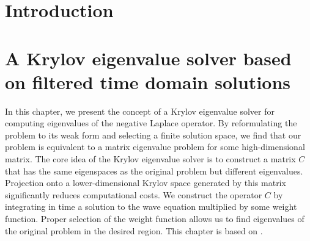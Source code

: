\documentclass[a4paper,11pt,bibliography=totoc,listof=totoc,headinclude=true,cleardoublepage=empty,oneside]{scrbook}
\begin{document}
\cleardoublepage



\tableofcontents

\cleardoublepage
{} 


\chapter{Introduction}
\label{chapter:introduction}


\chapter{A Krylov eigenvalue solver based on filtered time domain solutions}
\label{chapter:ftd}
In this chapter, we present the concept of a Krylov eigenvalue solver for computing eigenvalues of the negative Laplace operator. By reformulating the problem to its weak form and selecting a finite solution space, we find that our problem is equivalent to a matrix eigenvalue problem for some high-dimensional matrix. The core idea of the Krylov eigenvalue solver is to construct a matrix $C$ that has the same eigenspaces as the original problem but different eigenvalues. Projection onto a lower-dimensional Krylov space generated by this matrix significantly reduces computational costs. We construct the operator $C$ by integrating in time a solution to the wave equation multiplied by some weight function. Proper selection of the weight function allows us to find eigenvalues of the original problem in the desired region. This chapter is based on \cite{nannen}.
\end{document}
